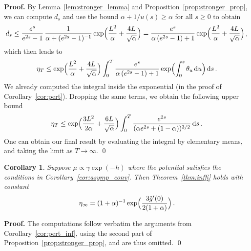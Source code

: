 \documentclass[12pt]{article}
\newcommand{\1}{\mathds{1}}
\newcommand*{\rd}{\mathrm{d}}
\newcommand*{\dd}{\, \rd}
\renewenvironment{proof}{\noindent\textbf{Proof.}\hspace*{.3em}}{\qed \vspace{.1in}}
\theoremstyle{plain}
\newtheorem{corollary}[theorem]{Corollary}
\theoremstyle{definition}
\theoremstyle{remark}
\begin{document}
\begin{proof}
By {Lemma~\ref{lem:stronger_lemma} and Proposition~\ref{prop:stronger_prop}}, we can compute $d_s$ and use the bound $\alpha + 1/u(s) \geq \alpha$ for all $s \geq 0$ to obtain
\begin{align*}
    d_s \leq \frac{e^s}{e^{2s}-1}\,\frac{1}{\alpha + (e^{2s}-1)^{-1}}\exp\Bigl(\frac{L^2}{\alpha} + \frac{4L}{\sqrt{\alpha}}\Bigr) = \frac{e^s}{\alpha\,(e^{2s} - 1) + 1}\exp\Bigl(\frac{L^2}{\alpha} + \frac{4L}{\sqrt{\alpha}}\Bigr) \,,
\end{align*}
which then leads to
\begin{align*}
    \eta_T \leq \exp\Bigl(\frac{L^2}{\alpha} + \frac{4L}{\sqrt{\alpha}}\Bigr) \int_0^T \frac{e^{{s}}}{\alpha\,(e^{2{s}}-1) + 1}\exp\Bigl(\int_0^{{s}}\theta_u \dd u\Bigr)\dd s\,. 
\end{align*}
We already computed the integral inside the exponential (in the proof of Corollary~\ref{cor:pert}). Dropping the same terms, we obtain the following upper bound
\begin{align*}
    \eta_T \leq \exp\Bigl(\frac{3L^2}{2\alpha} + \frac{6L}{\sqrt{\alpha}}\Bigr) \int_0^T \frac{e^{2{s}}}{(\alpha e^{2{s}} + (1-\alpha))^{3/2}} \dd s\,. 
\end{align*}
One can obtain our final result by evaluating the integral by elementary means, and taking the limit as $T\to\infty$.
\end{proof}

\begin{corollary}
Suppose $\mu\propto \gamma\exp(-h)$ where the potential satisfies the conditions in Corollary~\ref{cor:asymp_conv}. Then Theorem~\ref{thm:inffi} holds with constant
\begin{align*}
    \eta_\infty = (1+\alpha)^{-1}\exp\Bigl(\frac{3\hat g'(0)}{2(1+\alpha)}\Bigr)\,.
\end{align*}
\end{corollary}
\begin{proof}
The computations follow verbatim the arguments from Corollary~\ref{cor:pert_inf}, using the second part of {Proposition~\ref{prop:stronger_prop}}, and are thus omitted.
\end{proof}


\end{document}
